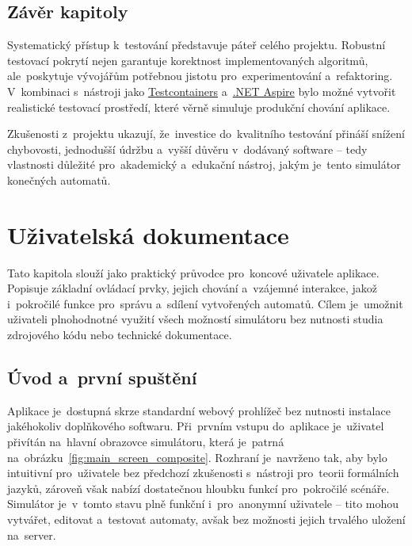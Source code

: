\documentclass[
  master,
  program=ainfvs,
  printversion,
  figures=false,
  tables=false,
  glossaries,
  index
]{kidiplom}
\begin{document}
\subsection{Závěr kapitoly}
Systematický přístup k~testování představuje páteř celého projektu. Robustní testovací pokrytí nejen garantuje korektnost implementovaných algoritmů, ale~poskytuje vývojářům potřebnou jistotu pro~experimentování a~refaktoring. V~kombinaci s~nástroji jako \hyperref[par:testcontainers]{Testcontainers} a~\hyperref[par:aspire]{.NET Aspire} bylo možné vytvořit realistické testovací prostředí, které věrně simuluje produkční chování aplikace. 

Zkušenosti z~projektu ukazují, že~investice do~kvalitního testování přináší snížení chybovosti, jednodušší údržbu a~vyšší důvěru v~dodávaný software -- tedy vlastnosti důležité pro~akademický a~edukační nástroj, jakým je~tento simulátor konečných automatů.


\newpage
\section{Uživatelská dokumentace}
Tato kapitola slouží jako praktický průvodce pro~koncové uživatele aplikace. Popisuje základní ovládací prvky, jejich chování a~vzájemné interakce, jakož i~pokročilé funkce pro~správu a~sdílení vytvořených automatů. Cílem je~umožnit uživateli plnohodnotné využití všech možností simulátoru bez nutnosti studia zdrojového kódu nebo technické dokumentace.

\subsection{Úvod a~první spuštění}
Aplikace je~dostupná skrze standardní webový prohlížeč bez nutnosti instalace jakéhokoliv doplňkového softwaru. Při~prvním vstupu do~aplikace je~uživatel přivítán na~hlavní obrazovce simulátoru, která je~patrná na~obrázku~\ref{fig:main_screen_composite}. Rozhraní je~navrženo tak, aby bylo intuitivní pro~uživatele bez předchozí zkušenosti s~nástroji pro~teorii formálních jazyků, zároveň však nabízí dostatečnou hloubku funkcí pro~pokročilé scénáře. Simulátor je~v~tomto stavu plně funkční i~pro~anonymní uživatele -- tito mohou vytvářet, editovat a~testovat automaty, avšak bez možnosti jejich trvalého uložení na~server.
\end{document}
